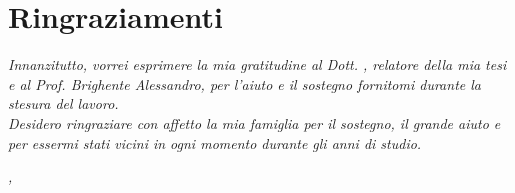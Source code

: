\cleardoublepage
{}
{}



\bigskip

\begingroup
\let\clearpage\relax
\let\cleardoublepage\relax
\let\cleardoublepage\relax

\chapter*{Ringraziamenti}

\noindent \textit{Innanzitutto, vorrei esprimere la mia gratitudine al Dott. \myProf, relatore della mia tesi e al Prof. Brighente Alessandro, per l'aiuto e il sostegno fornitomi durante la stesura del lavoro.}\\

\noindent \textit{Desidero ringraziare con affetto la mia famiglia per il sostegno, il grande aiuto e per essermi stati vicini in ogni momento durante gli anni di studio.}\\

\bigskip

\noindent\textit{\myLocation, \myTime}
\hfill \myName

\endgroup
